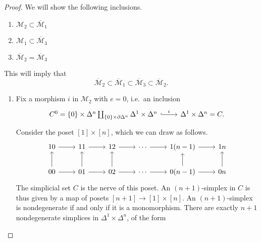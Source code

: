 \documentclass[main.tex]{subfiles}
\begin{document}
\begin{proof}
  We will show the following inclusions.
  \begin{enumerate}
    \item $\mathcal{M}_{2} \subset \overline{\mathcal{M}}_{1}$

    \item $\mathcal{M}_{1} \subset \overline{\mathcal{M}}_{3}$

    \item $\overline{\mathcal{M}}_{2} = \overline{\mathcal{M}}_{3}$
  \end{enumerate}
  This will imply that
  \begin{equation*}
    \overline{\mathcal{M}}_{2} \subset \overline{\mathcal{M}}_{1} \subset \overline{\mathcal{M}}_{3} \subset \overline{\mathcal{M}}_{2}.
  \end{equation*}
  \begin{enumerate}
    \item Fix a morphism $i$ in $\mathcal{M}_{2}$ with $e = 0$, i.e.\ an inclusion
      \begin{equation*}
        \begin{tikzcd}
          C^{0} = \{0\} \times \Delta^{n} \coprod_{\{0\} \times \partial \Delta^{n}} \Delta^{1} \times \Delta^{n}
          \arrow[r, hook, "i"]
          & \Delta^{1} \times \Delta^{n} = C.
        \end{tikzcd}
      \end{equation*}
      Consider the poset $[1] \times [n]$, which we can draw as follows.
      \begin{equation*}
        \begin{tikzcd}
          10
          \arrow[r]
          & 11
          \arrow[r]
          & 12
          \arrow[r]
          & \cdots
          \arrow[r]
          & 1(n-1)
          \arrow[r]
          & 1n
          \\
          00
          \arrow[u]
          \arrow[r]
          & 01
          \arrow[u]
          \arrow[r]
          & 02
          \arrow[u]
          \arrow[r]
          & \cdots
          \arrow[r]
          & 0(n-1)
          \arrow[u]
          \arrow[r]
          & 0n
          \arrow[u]
        \end{tikzcd}
      \end{equation*}
      The simplicial set $C$ is the nerve of this poset. An $(n+1)$-simplex in $C$ is thus given by a map of posets $[n+1] \to [1] \times [n]$. An $(n+1)$-simplex is nondegenerate if and only if it is a monomorphism. There are exactly $n+1$ nondegenerate simplices in $\Delta^{1} \times \Delta^{n}$, of the form

\end{enumerate}
\end{proof}
\end{document}
